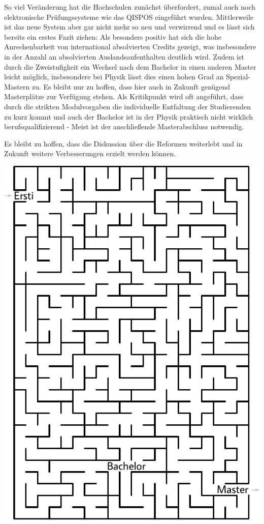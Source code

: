 \begin{multicols}{2}
So viel Veränderung hat die Hochschulen zunächst überfordert, zumal auch noch elektronische Prüfungssysteme wie das QISPOS eingeführt wurden. Mittlerweile ist das neue System aber gar nicht mehr so neu und verwirrend und es lässt sich bereits ein erstes Fazit ziehen:
Als besonders positiv hat sich die hohe Anrechenbarkeit von international absolvierten Credits gezeigt, was insbesondere in der Anzahl an absolvierten Auslandsaufenthalten deutlich wird. Zudem ist durch die Zweistufigkeit ein Wechsel nach dem Bachelor in einen anderen Master leicht möglich, insbesondere bei Physik lässt dies einen hohen Grad an Spezial-Mastern zu.
Es bleibt nur zu hoffen, dass hier auch in Zukunft genügend Masterplätze zur Verfügung stehen.
Als Kritikpunkt wird oft angeführt, dass durch die strikten Modulvorgaben die individuelle Entfaltung der Studierenden zu kurz kommt und auch der Bachelor ist in der Physik praktisch nicht wirklich berufsqualifizierend - Meist ist der anschließende Masterabschluss notwendig.

Es bleibt zu hoffen, dass die Diskussion über die Reformen weiterlebt und in Zukunft weitere Verbesserungen erzielt werden können.

\end{multicols}

\begin{center}
	\includegraphics[width=\textwidth, height=0.38\textheight]{res/bachelor_master_labyrinth.pdf}
\end{center}
